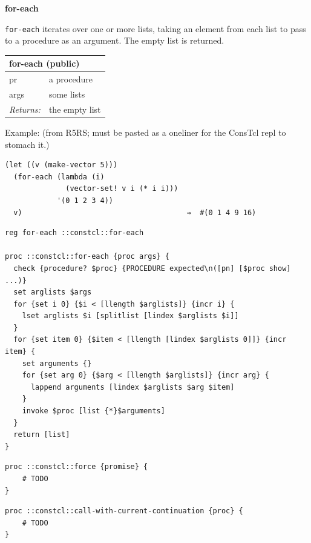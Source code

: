 \documentclass[twoside,9pt]{report}
\begin{document}
\textbf{for-each}


\texttt{for-each} iterates over one or more lists, taking an element from each list to pass to a procedure as an argument. The empty list is returned.

\begin{tabular}{ |l l| }
\hline
\multicolumn{2}{|l|}{for-each (public)} \\
\hline
pr & a procedure \\
args & some lists \\
\textit{Returns:} & the empty list \\
\hline
\end{tabular}


Example: (from R5RS; must be pasted as a oneliner for the ConsTcl repl to stomach it.)

\noindent\makebox[\linewidth]{\rule{\linewidth}{0.4pt}}
\begin{lstlisting}
(let ((v (make-vector 5)))
  (for-each (lambda (i)
              (vector-set! v i (* i i)))
            '(0 1 2 3 4))
  v)                                      ⇒  #(0 1 4 9 16)
\end{lstlisting}
\noindent\makebox[\linewidth]{\rule{\linewidth}{0.4pt}}
\noindent\makebox[\linewidth]{\rule{\linewidth}{0.4pt}}
\begin{lstlisting}
reg for-each ::constcl::for-each
 
proc ::constcl::for-each {proc args} {
  check {procedure? $proc} {PROCEDURE expected\n([pn] [$proc show] ...)}
  set arglists $args
  for {set i 0} {$i < [llength $arglists]} {incr i} {
    lset arglists $i [splitlist [lindex $arglists $i]]
  }
  for {set item 0} {$item < [llength [lindex $arglists 0]]} {incr item} {
    set arguments {}
    for {set arg 0} {$arg < [llength $arglists]} {incr arg} {
      lappend arguments [lindex $arglists $arg $item]
    }
    invoke $proc [list {*}$arguments]
  }
  return [list]
}
\end{lstlisting}
\noindent\makebox[\linewidth]{\rule{\linewidth}{0.4pt}}
\noindent\makebox[\linewidth]{\rule{\linewidth}{0.4pt}}
\begin{lstlisting}
proc ::constcl::force {promise} {
    # TODO
}
\end{lstlisting}
\noindent\makebox[\linewidth]{\rule{\linewidth}{0.4pt}}
\noindent\makebox[\linewidth]{\rule{\linewidth}{0.4pt}}
\begin{lstlisting}
proc ::constcl::call-with-current-continuation {proc} {
    # TODO
}
\end{lstlisting}
\noindent\makebox[\linewidth]{\rule{\linewidth}{0.4pt}}
\end{document}
